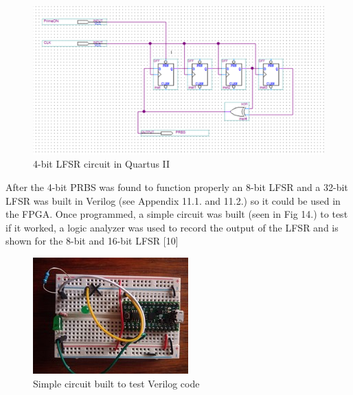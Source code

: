 \documentclass[conference]{IEEEtran}
\begin{document}
\begin{figure}[h!]
\includegraphics[width=\linewidth]{fig 12.png}\par
\caption{4-bit LFSR circuit in Quartus II}
\label{fig}
\end{figure}


After the 4-bit PRBS was found to function properly an 8-bit LFSR and a 32-bit LFSR was built in Verilog (see Appendix 11.1. and 11.2.) so it could be used in the FPGA. Once programmed, a simple circuit was built (seen in Fig 14.) to test if it worked, a logic analyzer was used to record the output of the LFSR and is shown for the 8-bit and 16-bit LFSR [10]
\\
\begin{figure}[h!]
\centerline{\includegraphics[width=0.9\linewidth]{fig 14.jpg}}\par
\caption{Simple circuit built to test Verilog code}
\label{fig}
\end{figure}
\end{document}
